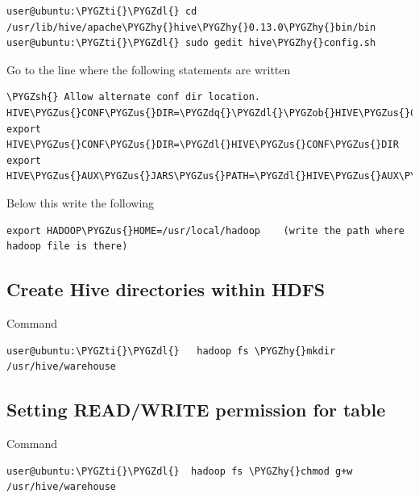 \documentclass[letterpaper,10pt,english]{sphinxmanual}
\def\PYGZus{\char`\_}
\def\PYGZob{\char`\{}
\def\PYGZsh{\char`\#}
\def\PYGZdl{\char`\$}
\def\PYGZhy{\char`\-}
\def\PYGZdq{\char`\"}
\def\PYGZti{\char`\~}
\begin{document}
\begin{Verbatim}[commandchars=\\\{\}]
user@ubuntu:\PYGZti{}\PYGZdl{} cd  /usr/lib/hive/apache\PYGZhy{}hive\PYGZhy{}0.13.0\PYGZhy{}bin/bin
user@ubuntu:\PYGZti{}\PYGZdl{} sudo gedit hive\PYGZhy{}config.sh
\end{Verbatim}

Go to the line where the following statements are written

\begin{Verbatim}[commandchars=\\\{\}]
\PYGZsh{} Allow alternate conf dir location.
HIVE\PYGZus{}CONF\PYGZus{}DIR=\PYGZdq{}\PYGZdl{}\PYGZob{}HIVE\PYGZus{}CONF\PYGZus{}DIR:\PYGZhy{}\PYGZdl{}HIVE\PYGZus{}HOME/conf\PYGZdq{}
export HIVE\PYGZus{}CONF\PYGZus{}DIR=\PYGZdl{}HIVE\PYGZus{}CONF\PYGZus{}DIR
export HIVE\PYGZus{}AUX\PYGZus{}JARS\PYGZus{}PATH=\PYGZdl{}HIVE\PYGZus{}AUX\PYGZus{}JARS\PYGZus{}PATH
\end{Verbatim}

Below this write the following

\begin{Verbatim}[commandchars=\\\{\}]
export HADOOP\PYGZus{}HOME=/usr/local/hadoop    (write the path where hadoop file is there)
\end{Verbatim}


\subsection{Create Hive directories within HDFS}
\label{hive:create-hive-directories-within-hdfs}
Command

\begin{Verbatim}[commandchars=\\\{\}]
user@ubuntu:\PYGZti{}\PYGZdl{}   hadoop fs \PYGZhy{}mkdir /usr/hive/warehouse
\end{Verbatim}


\subsection{Setting READ/WRITE permission for table}
\label{hive:setting-read-write-permission-for-table}
Command

\begin{Verbatim}[commandchars=\\\{\}]
user@ubuntu:\PYGZti{}\PYGZdl{}  hadoop fs \PYGZhy{}chmod g+w /usr/hive/warehouse
\end{Verbatim}
\end{document}
